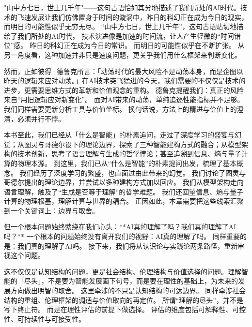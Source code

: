 "山中方七日，世上几千年"——这句古语恰如其分地描述了我们所处的AI时代。技术的飞速发展让我们仿佛置身于时间的漩涡中，昨日的科幻正在成为今日的现实，而明日的可能性似乎无穷无尽。
“山中方七日，世上几千年”，这句古语贴切地描绘了我们所处的AI时代。
技术演进像是加速的时间流，让人产生轻微的“时间错位”感。
昨日的科幻正在成为今日的常识。
而明日的可能性似乎在不断扩张。
从另一角度看，这种加速并非只是速度问题，更关乎我们用什么框架来判断变化。

然而，正如彼得·德鲁克所言：「动荡时代的最大风险不是动荡本身，而是企图以昨天的逻辑来应对动荡。」在AI技术突飞猛进的今天，我们需要的不仅仅是技术的进步，更需要思维方式的革新和价值观念的重构。
德鲁克提醒我们：真正的风险来自“用旧逻辑应对新变化”。
面对AI带来的动荡，单纯追逐性能指标并不足够。
我们同样需要更新分析工具与价值坐标。
换句话说，方法上的精进与价值上的澄清，必须并行不悖。

本书至此，我们已经从「什么是智能」的朴素追问，走过了深度学习的盛宴与幻觉；从图灵与哥德尔设下的理论边界，探索了三种智能建构方式的融合；从模型架构的技术创新，思考了语言理解与生成的哲学悖论；甚至追溯到信息、熵与量子计算的物理本源。
到这里，我们已从“什么是智能”的朴素提问出发，梳理了基本概念。
我们经历了深度学习的繁盛，也直面过由此带来的幻觉。
我们讨论了图灵与哥德尔提出的理论边界，并尝试以多种建构方式加以回应。
我们从模型架构走向语言理解，触及了“生成是否等于理解”的哲学难题。
我们还回望信息、熵与量子计算的物理根基，理解计算与世界的耦合。
正因如此，本章需要把这些线索汇聚到一个关键词上：边界与取舍。

但一个根本问题始终萦绕在我们心头：**AI真的理解了吗？我们真的理解了AI吗？**
一个根本的问题始终没有离开我们的视野：AI真的理解了吗。
同样重要的是：我们真的理解了AI吗。
接下来，我们将从认识论与实践论两条路径，重新审视这个问题。

这不仅仅是认知结构的问题，更是社会结构、伦理结构与价值选择的问题。理解智能的「尽头」，不是要为智能发展画下句号，而是要在理性的基础上，为未来的发展方向做出明智的取舍。
这里牵涉的不只是认知结构的可达边界。
同样牵涉社会结构的重组、伦理框架的调适与价值取向的再定位。
所谓“理解的尽头”，并不是写下终止符。
而是在理性评估的前提下做选择。
评估的维度包括可解释性、可控性、可持续性与可接受性。



